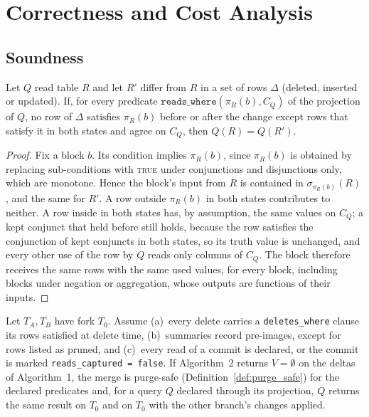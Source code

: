 \documentclass[sigconf, nonacm]{acmart}
\begin{document}
\section{Correctness and Cost Analysis}
\label{sec:correctness}

\subsection{Soundness}
\label{sec:correctness_proofs}

\begin{lemma}[Projection]
\label{lem:projection}
Let $Q$ read table $R$ and let $R'$ differ from $R$ in a set of rows $\Delta$ (deleted, inserted or updated). If, for every predicate $\texttt{reads\_where}(\pi_R(b), C_Q)$ of the projection of $Q$, no row of $\Delta$ satisfies $\pi_R(b)$ before or after the change except rows that satisfy it in both states and agree on $C_Q$, then $Q(R) = Q(R')$.
\end{lemma}

\begin{proof}
Fix a block $b$. Its condition implies $\pi_R(b)$, since $\pi_R(b)$ is obtained by replacing sub-conditions with \textsc{true} under conjunctions and disjunctions only, which are monotone. Hence the block's input from $R$ is contained in $\sigma_{\pi_R(b)}(R)$, and the same for $R'$. A row outside $\pi_R(b)$ in both states contributes to neither. A row inside in both states has, by assumption, the same values on $C_Q$; a kept conjunct that held before still holds, because the row satisfies the conjunction of kept conjuncts in both states, so its truth value is unchanged, and every other use of the row by $Q$ reads only columns of $C_Q$. The block therefore receives the same rows with the same used values, for every block, including blocks under negation or aggregation, whose outputs are functions of their inputs.
\end{proof}

\begin{theorem}[Soundness]
\label{thm:soundness}
Let $T_A, T_B$ have fork $T_0$. Assume (a)~every delete carries a \texttt{deletes\_where} clause its rows satisfied at delete time, (b)~summaries record pre-images, except for rows listed as pruned, and (c)~every read of a commit is declared, or the commit is marked \texttt{reads\_captured = false}. If Algorithm~2 returns $V = \emptyset$ on the deltas of Algorithm~1, the merge is purge-safe (Definition~\ref{def:purge_safe}) for the declared predicates and, for a query $Q$ declared through its projection, $Q$ returns the same result on $T_0$ and on $T_0$ with the other branch's changes applied.
\end{theorem}
\end{document}
